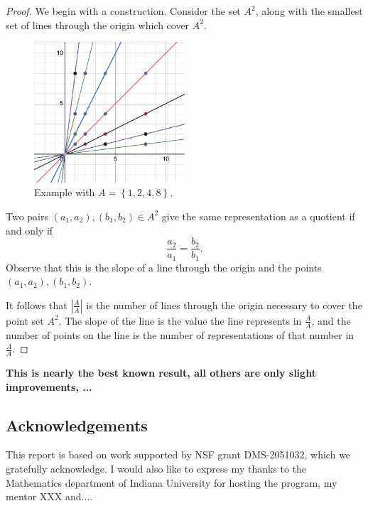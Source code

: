 \documentclass[12pt]{amsart}
\begin{document}
\begin{proof}
We begin with a construction. Consider the set \(A^{2}\), along with the smallest set of lines
through the origin which cover \(A^{2}\).

\begin{figure}[h]
    \centering
    \includegraphics[width=0.5\textwidth]{Sol1.png}
    \caption{Example with \(A = \left\{ 1,2,4,8 \right\} \).}
\end{figure}

Two pairs \((a_1,a_2),(b_1,b_2) \in A^{2}\) give the same representation as a quotient if
and only if
\[
    \frac{a_2}{a_1} = \frac{b_2}{b_1} 
.\]
Observe that this is the slope of a line through the origin and the points \((a_1,a_2), (b_1,b_2)\).

It follows that \(\left\lvert \frac{A}{A} \right\rvert \) is the number of lines through the origin
necessary to cover the point set \(A^{2}\). The slope of the line is the value the line represents 
in \(\frac{A}{A} \), and the number of points on the line is the number of representations of that number in \(\frac{A}{A} \).
\end{proof}

\textbf{This is nearly the best known result, all others are only slight improvements, ... }



\subsection*{Acknowledgements} %
This report is based on work supported by NSF grant DMS-2051032, which we gratefully acknowledge. I would also like to express my thanks to the Mathematics department of Indiana University for hosting the program, my mentor XXX and....
\end{document}
